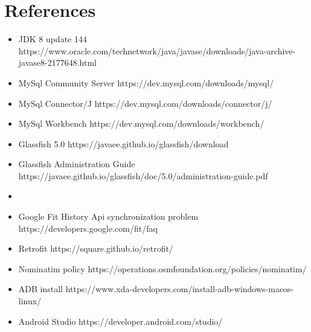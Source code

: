 \section{References}

\begin{itemize}
\item JDK 8 update 144 https://www.oracle.com/technetwork/java/javase/downloads/java-archive-javase8-2177648.html
\item MySql Community Server https://dev.mysql.com/downloads/mysql/
\item MySql Connector/J https://dev.mysql.com/downloads/connector/j/
\item MySql Workbench https://dev.mysql.com/downloads/workbench/
\item Glassfish 5.0 https://javaee.github.io/glassfish/download
\item Glassfish Administration Guide https://javaee.github.io/glassfish/doc/5.0/administration-guide.pdf
\item 
\item Google Fit History Api synchronization problem https://developers.google.com/fit/faq
\item Retrofit https://square.github.io/retrofit/
\item Nominatim policy https://operations.osmfoundation.org/policies/nominatim/
\item ADB install https://www.xda-developers.com/install-adb-windows-macos-linux/
\item Android Studio https://developer.android.com/studio/
\end{itemize}